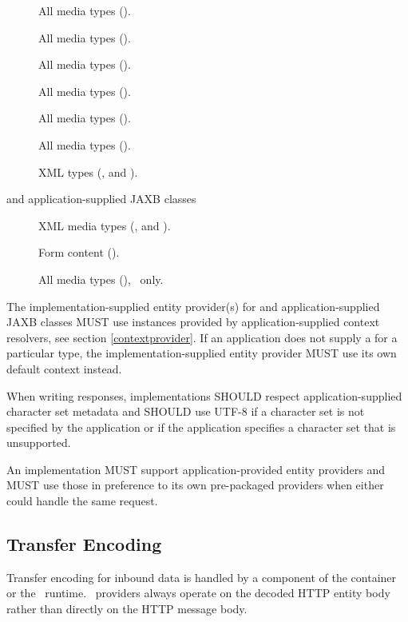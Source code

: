 \begin{description}
\item[] All media types (\code{*/*}).
\item[] All media types (\code{*/*}).
\item[] All media types (\code{*/*}).
\item[] All media types (\code{*/*}).
\item[] All media types (\code{*/*}).
\item[] All media types (\code{*/*}).
\item[] XML types (,  and ).
\item[ and application-supplied JAXB classes] XML media types (,  and ).
\item[] Form content ().
\item[] All media types (\code{*/*}), \MsgWrite\ only.
\end{description}

The implementation-supplied entity provider(s) for  and application-supplied JAXB classes MUST use  instances provided by application-supplied context resolvers, see section \ref{contextprovider}. If an application does not supply a  for a particular type, the implementation-supplied entity provider MUST use its own default context instead.

When writing responses, implementations SHOULD respect application-supplied character set metadata and SHOULD use UTF-8 if a character set is not specified by the application or if the application specifies a character set that is unsupported.

An implementation MUST support application-provided entity providers and MUST use those in preference to its own pre-packaged providers when either could handle the same request.

\subsection{Transfer Encoding}

Transfer encoding for inbound data is handled by a component of the container or the \jaxrs\ runtime. \MsgRead\ providers always operate on the decoded HTTP entity body rather than directly on the HTTP message body.

